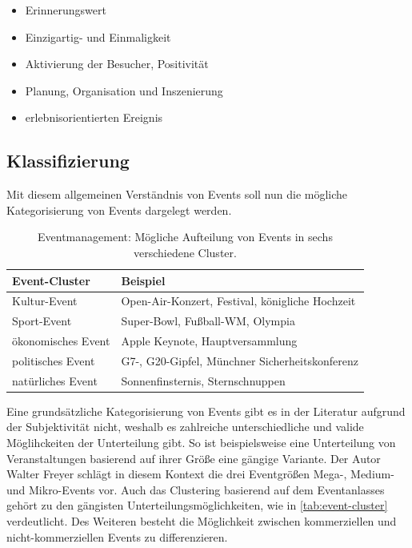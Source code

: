 \begin{itemize}
    \item Erinnerungswert
    \item Einzigartig- und Einmaligkeit
    \item Aktivierung der Besucher, Positivität
    \item Planung, Organisation und Inszenierung
    \item erlebnisorientierten Ereignis
\end{itemize}\autocite[Vgl.][S. 23 ff.]{Eisermann.2014} 

\subsection{Klassifizierung}
Mit diesem allgemeinen Verständnis von Events soll nun die mögliche Kategorisierung von Events dargelegt werden. 

\begin{table}[!h]
    \centering
    \begin{tabular}{l|l}
        \textbf{Event-Cluster}      & \textbf{Beispiel} \\ \hline
        Kultur-Event                & Open-Air-Konzert, Festival, königliche Hochzeit        \\ \hline
        Sport-Event                 & Super-Bowl, Fußball-WM, Olympia   \\ \hline
        ökonomisches Event          & Apple Keynote, Hauptversammlung   \\ \hline
        politisches Event           & G7-, G20-Gipfel, Münchner Sicherheitskonferenz                   \\ \hline
        natürliches Event           & Sonnenfinsternis, Sternschnuppen        
    \end{tabular}%
    \caption{Eventmanagement: Mögliche Aufteilung von Events in sechs verschiedene Cluster.}
    \label{tab:event-cluster}
\end{table}

Eine grundsätzliche Kategorisierung von Events gibt es in der Literatur aufgrund der Subjektivität nicht, weshalb es zahlreiche unterschiedliche und valide Möglihckeiten der Unterteilung gibt.
So ist beispielsweise eine Unterteilung von Veranstaltungen basierend auf ihrer Größe eine gängige Variante.
Der Autor Walter Freyer schlägt in diesem Kontext die drei Eventgrößen Mega-, Medium- und Mikro-Events vor.
Auch das Clustering basierend auf dem Eventanlasses gehört zu den gängisten Unterteilungsmöglichkeiten, wie in \autoref{tab:event-cluster} verdeutlicht.
Des Weiteren besteht die Möglichkeit zwischen kommerziellen und nicht-kommerziellen Events zu differenzieren.\autocite[Vgl.][S. 23 ff.]{Eisermann.2014} 

